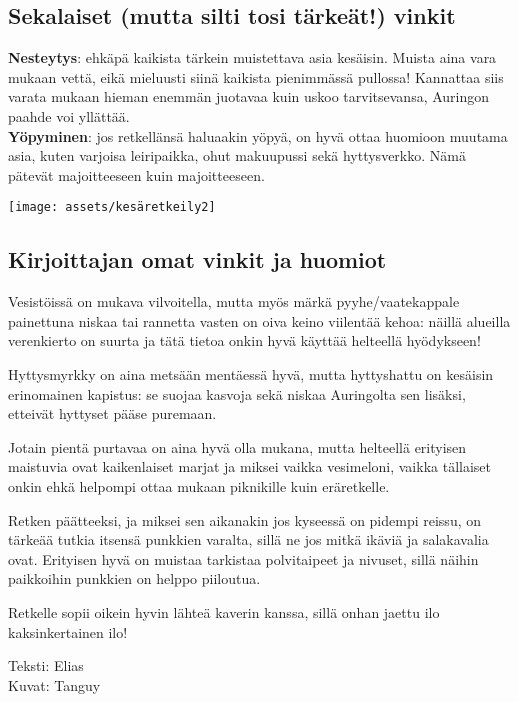 \begin{multicols}{2}
\subsection*{Sekalaiset (mutta silti tosi tärkeät!) vinkit}

\textbf{Nesteytys}: ehkäpä kaikista tärkein muistettava asia kesäisin. Muista aina vara mukaan vettä, eikä mieluusti siinä kaikista pienimmässä pullossa! Kannattaa siis varata mukaan hieman enemmän juotavaa kuin uskoo tarvitsevansa, Auringon paahde voi yllättää.\\
\textbf{Yöpyminen}: jos retkellänsä haluaakin yöpyä, on hyvä ottaa huomioon muutama asia, kuten varjoisa leiripaikka, ohut makuupussi sekä hyttysverkko. Nämä pätevät majoitteeseen kuin majoitteeseen.

\vspace*{0.32cm}
{\centering\texttt{[image: assets/kesäretkeily2]}}

\subsection*{Kirjoittajan omat vinkit ja huomiot}

Vesistöissä on mukava vilvoitella, mutta myös märkä pyyhe/vaatekappale painettuna niskaa tai rannetta vasten on oiva keino viilentää kehoa: näillä alueilla verenkierto on suurta ja tätä tietoa onkin hyvä käyttää helteellä hyödykseen!

Hyttysmyrkky on aina metsään mentäessä hyvä, mutta hyttyshattu on kesäisin erinomainen kapistus: se suojaa kasvoja sekä niskaa Auringolta sen lisäksi, etteivät hyttyset pääse puremaan.

Jotain pientä purtavaa on aina hyvä olla mukana, mutta helteellä erityisen maistuvia ovat kaikenlaiset marjat ja miksei vaikka vesimeloni, vaikka tällaiset onkin ehkä helpompi ottaa mukaan piknikille kuin eräretkelle.

Retken päätteeksi, ja miksei sen aikanakin jos kyseessä on pidempi reissu, on tärkeää tutkia itsensä punkkien varalta, sillä ne jos mitkä ikäviä ja salakavalia ovat. Erityisen hyvä on muistaa tarkistaa polvitaipeet ja nivuset, sillä näihin paikkoihin punkkien on helppo piiloutua.

Retkelle sopii oikein hyvin lähteä kaverin kanssa, sillä onhan jaettu ilo kaksinkertainen ilo!

\vspace*{0.32cm}
\noindent\null\hfill Teksti: Elias\\
\noindent\null\hfill Kuvat: Tanguy

\end{multicols}

